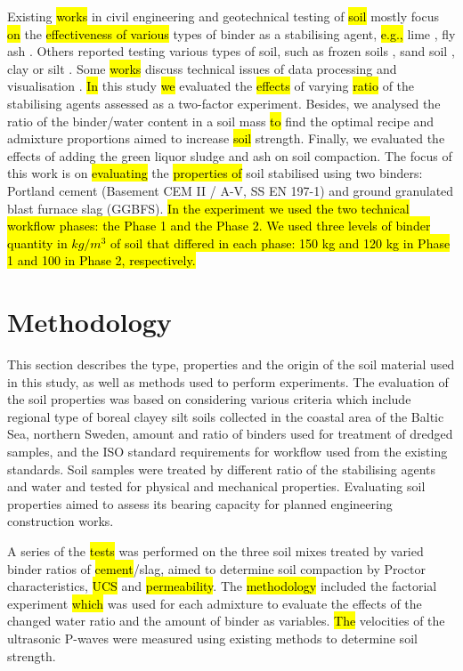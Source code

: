 \documentclass{amestyle}
\begin{document}
Existing \hl{works} in civil engineering and geotechnical testing of \hl{soil} mostly focus \hl{on} the \hl{effectiveness of various} types of binder as a stabilising agent, \hl{e.g.,} lime \cite{Rao,Mukhtar,Swaidani}, fly ash \cite{Phetchuay}. Others reported testing various types of soil, such as frozen soils \cite{Lemenkov2021b,Lemenkov2021c}, sand soil \cite{Robertson}, clay or silt \cite{Komal}. Some \hl{works} discuss technical issues of data processing and visualisation \cite{Kaellenetal2014,Lemenkov2021c}. \hl{In} this study \hl{we} evaluated the \hl{effects} of varying \hl{ratio} of the stabilising agents assessed as a two-factor experiment. Besides, we analysed the ratio of the binder/water content in a soil mass \hl{to} find the optimal recipe and admixture proportions aimed to increase \hl{soil} strength. Finally, we evaluated the effects of adding the green liquor sludge and ash on soil compaction. The focus of this work is on \hl{evaluating} the \hl{properties of} soil stabilised using two binders: Portland cement (Basement CEM II / A-V, SS EN 197-1) and ground granulated blast furnace slag (GGBFS). \hl{In the experiment we used the two technical workflow phases: the Phase 1 and the Phase 2. We used three levels of binder quantity in $kg/m^3$ of soil that differed in each phase: 150 kg and 120 kg in Phase 1 and 100 in Phase 2, respectively.}


\section{Methodology}
This section describes the type, properties and the origin of the soil material used in this study, as well as methods used to perform experiments. The evaluation of the soil properties was based on considering various criteria which include regional type of boreal clayey silt soils collected in the coastal area of the Baltic Sea, northern Sweden, amount and ratio of binders used for treatment of dredged samples, and the ISO standard requirements for workflow used from the existing standards. Soil samples were treated by different ratio of the stabilising agents and water and tested for physical and mechanical properties. Evaluating soil properties aimed to assess its bearing capacity for planned engineering construction works.

A series of the \hl{tests} was performed on the three soil mixes treated by varied binder ratios of \hl{cement}/slag, aimed to determine soil compaction by Proctor characteristics, \hl{UCS} and \hl{permeability}. The \hl{methodology} included the factorial experiment \hl{which} was used for each admixture to evaluate the effects of the changed water ratio and the amount of binder as variables. \hl{The} velocities of the ultrasonic P-waves were measured using existing\hl{ }methods \cite{Lindh202102} to determine soil strength. 
\end{document}

